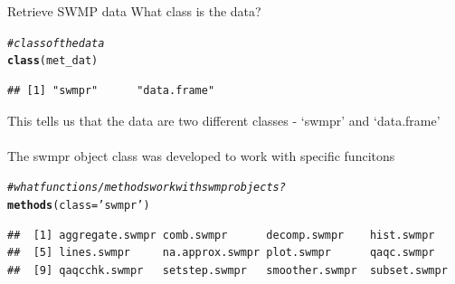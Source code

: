 \documentclass[xcolor=svgnames]{beamer}\usepackage[]{graphicx}\usepackage[]{color}
\makeatletter
\newcommand{\hlstr}[1]{\textcolor[rgb]{0.192,0.494,0.8}{#1}}%
\newcommand{\hlcom}[1]{\textcolor[rgb]{0.678,0.584,0.686}{\textit{#1}}}%
\newcommand{\hlstd}[1]{\textcolor[rgb]{0.345,0.345,0.345}{#1}}%
\newcommand{\hlkwc}[1]{\textcolor[rgb]{0.333,0.667,0.333}{#1}}%
\newcommand{\hlkwd}[1]{\textcolor[rgb]{0.737,0.353,0.396}{\textbf{#1}}}%
\newenvironment{kframe}{%
 \def\at@end@of@kframe{}%
 \ifinner\ifhmode%
  \def\at@end@of@kframe{\end{minipage}}%
  \begin{minipage}{\columnwidth}%
 \fi\fi%
 \def\FrameCommand##1{\hskip\@totalleftmargin \hskip-\fboxsep
 \colorbox{shadecolor}{##1}\hskip-\fboxsep
     \hskip-\linewidth \hskip-\@totalleftmargin \hskip\columnwidth}%
 \MakeFramed {\advance\hsize-\width
   \@totalleftmargin\z@ \linewidth\hsize
   \@setminipage}}%
 {\par\unskip\endMakeFramed%
 \at@end@of@kframe}
\newenvironment{knitrout}{}{} %
\makeatother
\begin{document}
\begin{frame}{Retrieve SWMP data}
What class is the data?
\begin{knitrout}\scriptsize
{}\color{fgcolor}\begin{kframe}
\begin{alltt}
\hlcom{# class of the data}
\hlkwd{class}\hlstd{(met_dat)}
\end{alltt}
\begin{verbatim}
## [1] "swmpr"      "data.frame"
\end{verbatim}
\end{kframe}
\end{knitrout}
This tells us that the data are two different classes - `swmpr' and `data.frame'\\~\\
The swmpr object class was developed to work with specific funcitons
\begin{knitrout}\scriptsize
{}\color{fgcolor}\begin{kframe}
\begin{alltt}
\hlcom{# what functions/methods work with swmpr objects?}
\hlkwd{methods}\hlstd{(}\hlkwc{class} \hlstd{=} \hlstr{'swmpr'}\hlstd{)}
\end{alltt}
\begin{verbatim}
##  [1] aggregate.swmpr comb.swmpr      decomp.swmpr    hist.swmpr     
##  [5] lines.swmpr     na.approx.swmpr plot.swmpr      qaqc.swmpr     
##  [9] qaqcchk.swmpr   setstep.swmpr   smoother.swmpr  subset.swmpr
\end{verbatim}
\end{kframe}
\end{knitrout}
\end{frame}
\end{document}
